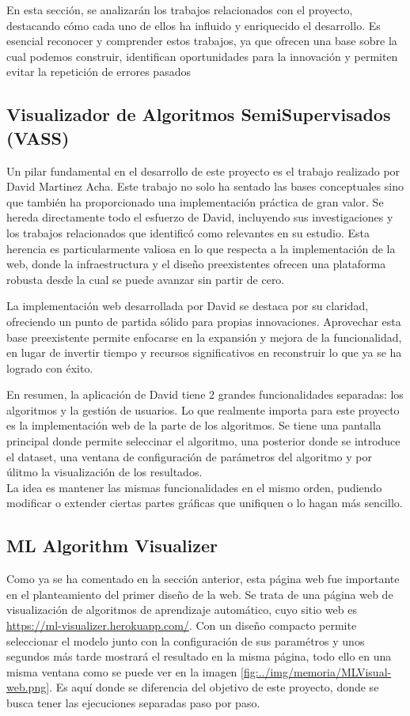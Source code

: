 En esta sección, se analizarán los trabajos relacionados con el proyecto, destacando cómo cada uno de ellos ha influido y enriquecido el desarrollo. Es esencial reconocer y comprender estos trabajos, ya que ofrecen una base sobre la cual podemos construir, identifican oportunidades para la innovación y permiten evitar la repetición de errores pasados
\subsection{Visualizador de Algoritmos SemiSupervisados (VASS)}
Un pilar fundamental en el desarrollo de este proyecto es el trabajo realizado por David Martinez Acha. Este trabajo no solo ha sentado las bases conceptuales sino que también ha proporcionado una implementación práctica de gran valor. Se hereda directamente todo el esfuerzo de David, incluyendo sus investigaciones y los trabajos relacionados que identificó como relevantes en su estudio. Esta herencia es particularmente valiosa en lo que respecta a la implementación de la web, donde la infraestructura y el diseño preexistentes ofrecen una plataforma robusta desde la cual se puede avanzar sin partir de cero.

La implementación web desarrollada por David se destaca por su claridad, ofreciendo un punto de partida sólido para propias innovaciones. Aprovechar esta base preexistente permite enfocarse en la expansión y mejora de la funcionalidad, en lugar de invertir tiempo y recursos significativos en reconstruir lo que ya se ha logrado con éxito.

En resumen, la aplicación de David tiene 2 grandes funcionalidades separadas: los algoritmos y la gestión de usuarios. Lo que realmente importa para este proyecto es la implementación web de la parte de los algoritmos. Se tiene una pantalla principal donde permite seleccinar el algoritmo, una posterior donde se introduce el dataset, una ventana de configuración de parámetros del algoritmo y por úlitmo la visualización de los resultados.\\
La idea es mantener las mismas funcionalidades en el mismo orden, pudiendo modificar o extender ciertas partes gráficas que unifiquen o lo hagan más sencillo.

\subsection{ML Algorithm Visualizer}
Como ya se ha comentado en la sección anterior, esta página web fue importante en el planteamiento del primer diseño de la web. Se trata de una página web de visualización de algoritmos de aprendizaje automático, cuyo sitio web es \url{https://ml-visualizer.herokuapp.com/}. Con un diseño compacto permite seleccionar el modelo junto con la configuración de sus paramétros y unos segundos más tarde mostrará el resultado en la misma página, todo ello en una misma ventana como se puede ver en la imagen \ref{fig:../img/memoria/MLVisual-web.png}. Es aquí donde se diferencia del objetivo de este proyecto, donde se busca tener las ejecuciones separadas paso por paso.

